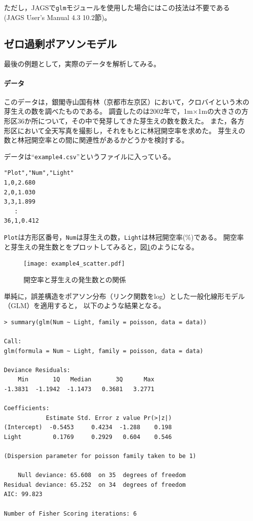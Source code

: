 \documentclass[11pt,uplatex]{jsarticle}
\begin{document}
ただし，\textsf{JAGS}で\texttt{glm}モジュールを使用した場合にはこの技法は不要である
(JAGS User's Manual 4.3 \cite{JAGS} 10.2節)。


\subsection{ゼロ過剰ポアソンモデル}
\label{path}

最後の例題として，実際のデータを解析してみる。

\paragraph{データ}
このデータは，銀閣寺山国有林（京都市左京区）において，クロバイという木の芽生えの数を調べたものである。
調査したのは2002年で，1m×1mの大きさの方形区36か所について，その中で発芽してきた芽生えの数を数えた。
また，各方形区において全天写真を撮影し，それをもとに林冠開空率を求めた。
芽生えの数と林冠開空率との間に関連性があるかどうかを検討する。

データは``\texttt{example4.csv}''というファイルに入っている。
\begin{lstlisting}
"Plot","Num","Light"
1,0,2.680
2,0,1.030
3,3,1.899
   :
36,1,0.412
\end{lstlisting}
\noindent
\texttt{Plot}は方形区番号，\texttt{Num}は芽生えの数，\texttt{Light}は林冠開空率(\%)である。
開空率と芽生えの発生数とをプロットしてみると，図\ref{example4_scatter}のようになる。

\begin{figure}[hbtp]
  \begin{center}
    \texttt{[image: example4\_scatter.pdf]}
  \end{center}
  \caption{開空率と芽生えの発生数との関係}
  \label{example4_scatter}
\end{figure}

単純に，誤差構造をポアソン分布（リンク関数をlog）とした一般化線形モデル（GLM）を適用すると，
以下のような結果となる。

\begin{lstlisting}
> summary(glm(Num ~ Light, family = poisson, data = data))

Call:
glm(formula = Num ~ Light, family = poisson, data = data)

Deviance Residuals: 
    Min       1Q   Median       3Q      Max  
-1.3831  -1.1942  -1.1473   0.3681   3.2771  

Coefficients:
            Estimate Std. Error z value Pr(>|z|)
(Intercept)  -0.5453     0.4234  -1.288    0.198
Light         0.1769     0.2929   0.604    0.546

(Dispersion parameter for poisson family taken to be 1)

    Null deviance: 65.608  on 35  degrees of freedom
Residual deviance: 65.252  on 34  degrees of freedom
AIC: 99.823

Number of Fisher Scoring iterations: 6
\end{lstlisting}
\end{document}
